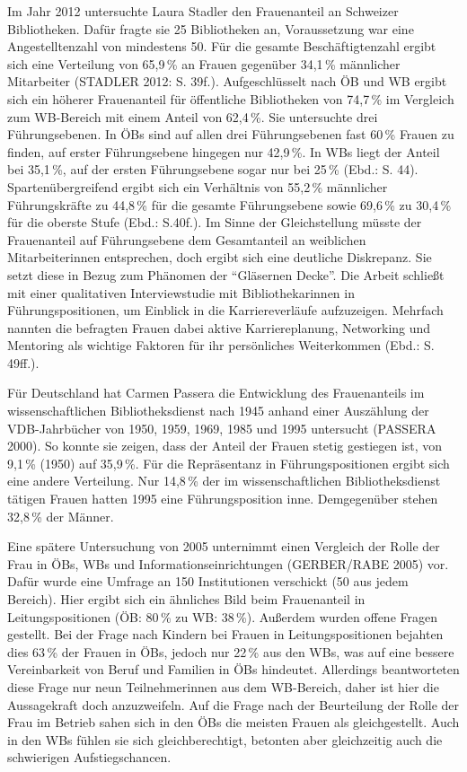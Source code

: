 \documentclass[a4paper,
fontsize=11pt,
oneside,
numbers=noperiodatend,
parskip=half-,
bibliography=totoc,
final
]{scrartcl}
\begin{document}
Im Jahr 2012 untersuchte Laura Stadler den Frauenanteil an Schweizer
Bibliotheken. Dafür fragte sie 25 Bibliotheken an, Voraussetzung war
eine Angestelltenzahl von mindestens 50. Für die gesamte
Beschäftigtenzahl ergibt sich eine Verteilung von 65,9\,\% an Frauen
gegenüber 34,1\,\% männlicher Mitarbeiter (STADLER 2012: S. 39f.).
Aufgeschlüsselt nach ÖB und WB ergibt sich ein höherer Frauenanteil für
öffentliche Bibliotheken von 74,7\,\% im Vergleich zum WB-Bereich mit
einem Anteil von 62,4\,\%. Sie untersuchte drei Führungsebenen. In ÖBs
sind auf allen drei Führungsebenen fast 60\,\% Frauen zu finden, auf
erster Führungsebene hingegen nur 42,9\,\%. In WBs liegt der Anteil bei
35,1\,\%, auf der ersten Führungsebene sogar nur bei 25\,\% (Ebd.: S. 44).
Spartenübergreifend ergibt sich ein Verhältnis von 55,2\,\% männlicher
Führungskräfte zu 44,8\,\% für die gesamte Führungsebene sowie 69,6\,\% zu
30,4\,\% für die oberste Stufe (Ebd.: S.40f.). Im Sinne der Gleichstellung
müsste der Frauenanteil auf Führungsebene dem Gesamtanteil an weiblichen
Mitarbeiterinnen entsprechen, doch ergibt sich eine deutliche
Diskrepanz. Sie setzt diese in Bezug zum Phänomen der \enquote{Gläsernen
Decke}. Die Arbeit schließt mit einer qualitativen Interviewstudie mit
Bibliothekarinnen in Führungspositionen, um Einblick in die
Karriereverläufe aufzuzeigen. Mehrfach nannten die befragten Frauen
dabei aktive Karriereplanung, Networking und Mentoring als wichtige
Faktoren für ihr persönliches Weiterkommen (Ebd.: S. 49ff.).

Für Deutschland hat Carmen Passera die Entwicklung des Frauenanteils im
wissenschaftlichen Bibliotheksdienst nach 1945 anhand einer Auszählung
der VDB-Jahrbücher von 1950, 1959, 1969, 1985 und 1995 untersucht
(PASSERA 2000). So konnte sie zeigen, dass der Anteil der Frauen stetig
gestiegen ist, von 9,1\,\% (1950) auf 35,9\,\%. Für die Repräsentanz in
Führungspositionen ergibt sich eine andere Verteilung. Nur 14,8\,\% der im
wissenschaftlichen Bibliotheksdienst tätigen Frauen hatten 1995 eine
Führungsposition inne. Demgegenüber stehen 32,8\,\% der Männer.

Eine spätere Untersuchung von 2005 unternimmt einen Vergleich der Rolle
der Frau in ÖBs, WBs und Informationseinrichtungen (GERBER/RABE 2005)
vor. Dafür wurde eine Umfrage an 150 Institutionen verschickt (50 aus
jedem Bereich). Hier ergibt sich ein ähnliches Bild beim Frauenanteil in
Leitungspositionen (ÖB: 80\,\% zu WB: 38\,\%). Außerdem wurden offene Fragen
gestellt. Bei der Frage nach Kindern bei Frauen in Leitungspositionen
bejahten dies 63\,\% der Frauen in ÖBs, jedoch nur 22\,\% aus den WBs, was
auf eine bessere Vereinbarkeit von Beruf und Familien in ÖBs hindeutet.
Allerdings beantworteten diese Frage nur neun Teilnehmerinnen aus dem
WB-Bereich, daher ist hier die Aussagekraft doch anzuzweifeln. Auf die
Frage nach der Beurteilung der Rolle der Frau im Betrieb sahen sich in
den ÖBs die meisten Frauen als gleichgestellt. Auch in den WBs fühlen
sie sich gleichberechtigt, betonten aber gleichzeitig auch die
schwierigen Aufstiegschancen.
\end{document}
